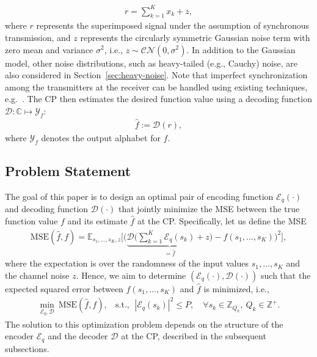 \documentclass[journal,12pt,onecolumn,draftclsnofoot]{IEEEtran}
\theoremstyle{definition}
\begin{document}
\begin{align}
{r} = \sum_{k=1}^{K}{x}_k + {z},
\end{align}
where  ${r}$ represents the superimposed signal under the assumption of synchronous transmission, and ${z}$ represents the circularly symmetric Gaussian noise term with zero mean and variance ${\sigma}^2$, i.e., $z \sim \mathcal{CN}(0,{\sigma}^2)$. In addition to the Gaussian model, other noise distributions, such as heavy-tailed (e.g., Cauchy) noise, are also considered in Section~\ref{sec:heavy-noise}. Note that imperfect synchronization among the transmitters at the receiver can be handled using existing techniques, e.g.~\cite{razavikia2022blind,Hellstrom2023Filter,sahin2025feasibility}. The CP then estimates the desired function value using a decoding function  $\mathscr{D}:\mathbb{C} \mapsto \mathcal{Y}_f$:
\begin{align}
\hat{f} := \mathscr{D}(r),
\end{align}
 where $\mathcal{Y}_f$ denotes the output alphabet for $f$. 




\subsection{Problem Statement}

The goal of this paper is to design an optimal pair of encoding function  $\mathscr{E}_q(\cdot)$ and decoding function $\mathscr{D}(\cdot)$ that jointly minimize the MSE between the true function value $f$ and its estimate $\hat{f}$ at the CP. Specifically, let us define the MSE 
\begin{align}
 \label{eq:MSEdefinition}
\text{MSE}(\hat{f}, f) = \mathbb{E}_{s_1,\ldots,s_K, z}\Bigg[\bigg(\underbrace{\mathscr{D}\Big( \sum\nolimits_{k=1}^{K} \mathscr{E}_q(s_k) + z \Big)}_{=\hat{f}} - f(s_1, \dots, s_K)\bigg)^2\Bigg],
\end{align}
where the expectation is over the randomness of the input values $s_1,\ldots,s_K$ and the channel noise $z$. Hence, we aim to determine $(\mathscr{E}_q(\cdot), \mathscr{D}(\cdot))$ such that the expected squared error between $f(s_1, \dots, s_K)$ and $\hat{f}$ is minimized, i.e., 
\begin{align}
\min_{\mathscr{E}_q, \mathscr{D}} ~ \text{MSE}(\hat{f}, f),~~~~\text{s.t.}, ~~  |\mathscr{E}_q(s_k)|^2 \leq P,\quad \forall s_k\in \mathbb{Z}_{Q_k}, ~ Q_k\in \mathbb{Z}^{+}. \label{eq:OptmialMSEgeneral}
\end{align}
 The solution to this optimization problem depends on the structure of the encoder $\mathscr{E}_q$  and the decoder $\mathscr{D}$ at the CP, described in the subsequent subsections. 
\end{document}
